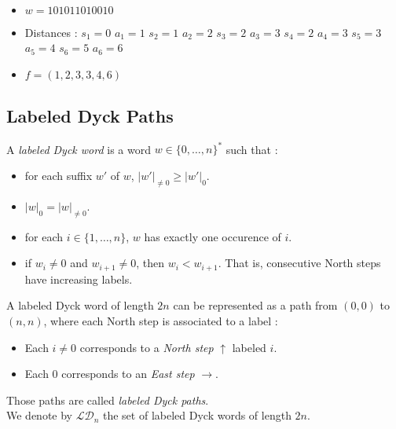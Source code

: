 \begin{example}[$n = 6, \mathcal{D}_n \to \mathcal{PF'}_n$]
    ~\
    \begin{itemize}
        \item $w = 101011010010$
    \end{itemize}
    
    \begin{itemize}
        \item Distances : 
            \subitem $s_1 = 0$
                \hspace{2cm} $a_1 = 1$
            \subitem $s_2 = 1$
                \hspace{2cm} $a_2 = 2$
            \subitem $s_3 = 2$
                \hspace{2cm} $a_3 = 3$
            \subitem $s_4 = 2$
                \hspace{2cm} $a_4 = 3$
            \subitem $s_5 = 3$
                \hspace{2cm} $a_5 = 4$
            \subitem $s_6 = 5$
                \hspace{2cm} $a_6 = 6$
        \item $f = (1, 2, 3, 3, 4, 6)$
    \end{itemize}
    
\end{example}

\subsection{Labeled Dyck Paths}

\begin{definition}
    A \emph{labeled Dyck word} is a word $w \in 
    \{0, \ldots, n\}^*$ such that :
    \begin{itemize}
        \item for each suffix $w'$ of $w$,
            $|w'|_{\neq 0} \geqslant |w'|_0$.
        \item $|w|_0 = |w|_{\neq 0}$.
        \item for each $i \in \{1, \ldots, n\}$, $w$ has 
            exactly one occurence of $i$.
        \item if $w_i \neq 0$ and $w_{i+1} \neq 0$,
            then $w_i < w_{i+1}$. That is, consecutive
            North steps have increasing labels.
    \end{itemize}
    A labeled Dyck word of length $2n$ can be represented
    as a path from $(0,0)$ to $(n,n)$, where each North
    step is associated to a label :
    \begin{itemize}
        \item Each $i \neq 0$ corresponds to a
            \emph{North step} $\uparrow$ labeled $i$.
        \item Each $0$ corresponds to an
            \emph{East step} $\rightarrow$.
    \end{itemize}
    Those paths are called \emph{labeled Dyck paths}.\\
    We denote by $\mathcal{LD}_n$ the set of labeled
    Dyck words of length $2n$.
\end{definition}

